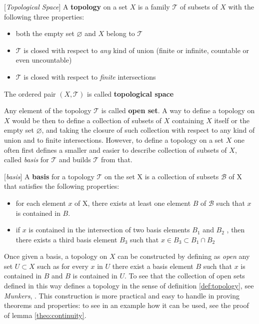 \begin{definition}{[\textit{Topological Space}]}
	A \textbf{topology} on a set $X$ is a family $\mathcal{T}$ of subsets of $X$ with the following three properties:
	\begin{itemize}
		\item both the empty set $\varnothing$ and $X$ belong to $\mathcal{T}$
		\item $\mathcal{T}$ is closed with respect to \textit{any} kind of union (finite or infinite, countable or even uncountable)
		\item $\mathcal{T}$ is closed with respect to \textit{finite} intersections
	\end{itemize}
	The ordered pair $(X,\mathcal{T})$ is called \textbf{topological space}
	\label{def:topology}
\end{definition}
Any element of the topology $\mathcal{T}$ is called \textbf{open set}. A way to define a topology on $X$ would be then to define a collection of subsets of $X$ containing $X$ itself or the empty set $\varnothing$, and taking the closure of such collection with respect to any kind of union and to finite intersections. However, to define a topology on a set $X$ one often first defines a smaller and easier to describe collection of subsets of $X$, called \textit{basis} for $\mathcal{T}$ and builds $\mathcal{T}$ from that.
\begin{definition}{[\textit{basis}]}
	A \textbf{basis} for a topology $\mathcal{T}$ on the set X is a collection of subsets $\mathcal{B}$ of X that satisfies the following properties:
	\begin{itemize}
		\item for each element $x$ of X, there exists at least one element  $B$ of $\mathcal{B}$ such that $x$ is contained in $B$.
		\item if $x$ is contained in the intersection of two basis elements $B_{1}$ and $B_{2}$ , then there exists a third basis element ${B_{3}}$ such that $x \in {B_{3}} \subset {B_{1}} \cap {B_{2}}$
	\end{itemize}
	\label{def:basis}
\end{definition}
Once given a basis, a topology on $X$ can be constructed by defining as \textit{open} any set ${U} \subset X$ such as for every $x$ in ${U}$ there exist a basis element $B$ such that $x$ is contained in $B$ and $B$ is contained in $U$. To see that the collection of open sets defined in this way defines a topology in the sense of definition \ref{def:topology}, see \textit{Munkers}, \cite{Munkres}. This construction is more practical and easy to handle in proving theorems and properties: to see in an example how it can be used, see the proof of lemma \ref{theo:continuity}. \newline
